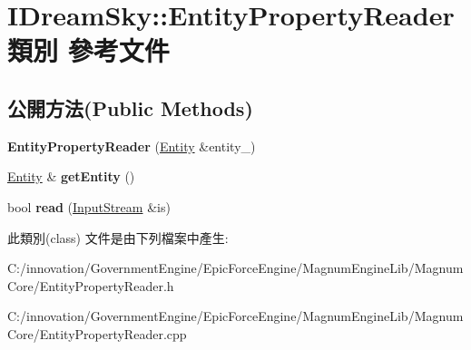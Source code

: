 \hypertarget{class_i_dream_sky_1_1_entity_property_reader}{}\section{I\+Dream\+Sky\+:\+:Entity\+Property\+Reader 類別 參考文件}
\label{class_i_dream_sky_1_1_entity_property_reader}
\subsection*{公開方法(Public Methods)}
\begin{DoxyCompactItemize}
\item 
{\bfseries Entity\+Property\+Reader} (\hyperlink{class_i_dream_sky_1_1_entity}{Entity} \&entity\+\_\+)\hypertarget{class_i_dream_sky_1_1_entity_property_reader_a45d82c0084ad2bf7c3d07ae55a94b3ca}{}\label{class_i_dream_sky_1_1_entity_property_reader_a45d82c0084ad2bf7c3d07ae55a94b3ca}

\item 
\hyperlink{class_i_dream_sky_1_1_entity}{Entity} \& {\bfseries get\+Entity} ()\hypertarget{class_i_dream_sky_1_1_entity_property_reader_a17c6ab27aec489fa53274c2d7cc4f279}{}\label{class_i_dream_sky_1_1_entity_property_reader_a17c6ab27aec489fa53274c2d7cc4f279}

\item 
bool {\bfseries read} (\hyperlink{class_i_dream_sky_1_1_input_stream}{Input\+Stream} \&is)\hypertarget{class_i_dream_sky_1_1_entity_property_reader_a28645abbcfe27a67fe8051c92a93e8d8}{}\label{class_i_dream_sky_1_1_entity_property_reader_a28645abbcfe27a67fe8051c92a93e8d8}

\end{DoxyCompactItemize}


此類別(class) 文件是由下列檔案中產生\+:\begin{DoxyCompactItemize}
\item 
C\+:/innovation/\+Government\+Engine/\+Epic\+Force\+Engine/\+Magnum\+Engine\+Lib/\+Magnum\+Core/Entity\+Property\+Reader.\+h\item 
C\+:/innovation/\+Government\+Engine/\+Epic\+Force\+Engine/\+Magnum\+Engine\+Lib/\+Magnum\+Core/Entity\+Property\+Reader.\+cpp\end{DoxyCompactItemize}
